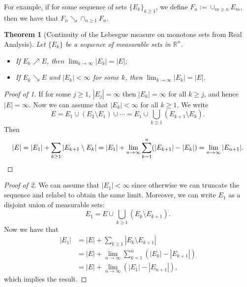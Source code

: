 \documentclass[12pt,reqno]{article}
\theoremstyle{plain}
\newtheorem{theorem}{Theorem}[section]
\theoremstyle{definition}
\begin{document}
For example, if for some sequence of sets $\{E_k\}_{k \geq 1}$, we define 
$F_n := \cup_{m \geq n} E_m$, then we have that $F_n \searrow \cap_{n \geq 1} F_n$. 

\begin{theorem}[Continuity of the Lebesgue measure on monotone sets from Real Analysis]
Let $\{E_k\}$ be a sequence of measurable sets in $\mathbb{R}^n$. 
\begin{itemize} 
\item[(1)] If $E_k \nearrow E$, then $\lim_{k \rightarrow \infty} |E_k| = |E|$; 
\item[(2)] If $E_k \searrow E$ and $|E_k| < \infty$ for some $k$, then 
     $\lim_{k \rightarrow \infty} |E_k| = |E|$. 
\end{itemize} 
\end{theorem} 
\begin{proof}[Proof of 1]
If for some $j \geq 1$, $|E_j| = \infty$ then $|E_k| = \infty$ for all $k \geq j$, and hence 
$|E| = \infty$. Now we can assume that $|E_k| < \infty$ for all $k \geq 1$. 
We write 
\[
E = E_1 \cup (E_2 \setminus E_1) \cup \cdots = E_1 \cup \bigcup_{k \geq 1} (E_{k+1} \setminus E_k). 
\]
Then 
\[
|E| = |E_1| + \sum_{k \geq 1} |E_{k+1} \setminus E_k| = |E_1| + \lim_{n \rightarrow \infty} 
     \sum_{k=1}^n (|E_{k+1}| - |E_k|) = \lim_{n \rightarrow \infty} |E_{n+1}|. 
     \qedhere
\]
\end{proof} 
\begin{proof}[Proof of 2]
We can assume that $|E_1| < \infty$ since otherwise we can truncate the sequence and relabel to 
obtain the same limit. Moreover, we can write $E_1$ as a disjoint union of 
measurable sets: 
\[
E_1 = E \cup \bigcup_{k \geq 1} (E_k \setminus E_{k+1}). 
\]
Now we have that 
\begin{align*} 
|E_1| & = |E| + \sum_{k \geq 1} |E_k \setminus E_{k+1}| \\ 
     & = |E| + \lim_{n \rightarrow \infty} \sum_{k=1}^n (|E_k|-|E_{k+1}|) \\ 
     & = |E| + \lim_{n \rightarrow \infty} (|E_1| - |E_{n+1}|), 
\end{align*} 
which implies the result. 
\end{proof} 
\end{document}
